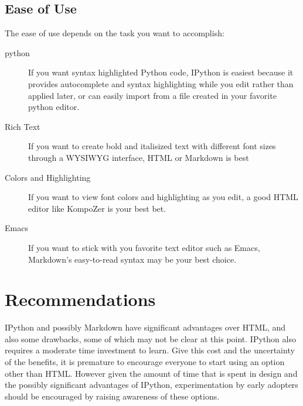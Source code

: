 \documentclass[]{article}
\begin{document}
\subsection{Ease of Use}
The ease of use depends on the task you want to accomplish:
\begin{description}
	\item[python] 
		If you want syntax highlighted Python code, IPython is easiest because it provides autocomplete and syntax highlighting while 
		you edit rather than applied later, or can easily import from a file created in your favorite python editor.
	\item[Rich Text] 
		If you want to create bold and italisized text with different font sizes through a WYSIWYG interface, HTML or Markdown is best
	\item[Colors and Highlighting] 
		If you want to view font colors and highlighting as you edit, a good HTML editor like KompoZer is your best bet.
	\item[Emacs]
		If you want to stick with you favorite text editor such as Emacs, Markdown's easy-to-read syntax may be your best choice.
\end{description}
	




\section{Recommendations}
	IPython and possibly Markdown have significant advantages over HTML, and also some drawbacks, some of which may not be clear at this point.  
	IPython also requires a moderate time investment to learn.  Give this cost and the uncertainty of the benefits, it is premature to encourage 
	everyone to start using an option other than HTML.  However given the amount of time that is spent in design and the possibly significant 
	advantages of IPython, experimentation by early adopters should be encouraged by raising awareness of these options.
	
	
\end{document}
